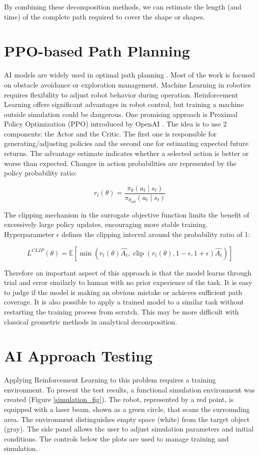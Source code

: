 \documentclass[11pt,a4paper,oneside,onecolumn]{article}
\begin{document}
By combining these decomposition methods, we can estimate the length (and time) of the complete path required to cover the shape or shapes.

\section{PPO-based Path Planning}
AI models are widely used in optimal path planning \cite{kufa2025pathplanning}. Most of the work is focused on obstacle avoidance or exploration management. Machine Learning in robotics requires flexibility to adjust robot behavior during operation. Reinforcement Learning offers significant advantages in robot control, but training a machine outside simulation could be dangerous. One promising approach is Proximal Policy Optimization (PPO) introduced by OpenAI \cite{schulman2017ppo}. The  idea is to use 2 components: the Actor and the Critic. The first one is responsible for generating/adjusting policies and the second one for estimating expected future returns. The advantage estimate indicates whether a selected action is better or worse than expected. Changes in action probabilities are represented by the policy probability ratio:

\begin{equation}
r_t(\theta) = \frac{\pi_{\theta}(a_t \mid s_t)}{\pi_{\theta_{\mathrm{old}}}(a_t \mid s_t)}
\end{equation}

The clipping mechanism in the surrogate objective function limits the benefit of excessively large policy updates, encouraging more stable training. Hyperparameter $\epsilon$ defines the clipping interval around the probability ratio of 1:

\begin{equation}
  L^{CLIP} (\theta) = \mathbb{E} [\min(r_t(\theta)\hat{A_t}, \operatorname{clip}(r_t(\theta), 1-\epsilon, 1+\epsilon)\hat{A_t})]
\end{equation}

Therefore an important aspect of this approach is that the model learns through trial and error similarly to human with no prior experience of the task. It is easy to judge if the model is making an obvious mistake or achieves sufficient path coverage. It is also possible to apply a trained model to a similar task without restarting the training process from scratch. This may be more difficult with classical geometric methods in analytical decomposition.

\section{AI Approach Testing}
Applying Reinforcement Learning to this problem requires a training environment. To present the test results, a functional simulation environment was created (Figure \ref{simulation_fig}). The robot, represented by a red point, is equipped with a laser beam, shown as a green circle, that scans the surrounding area. The environment distinguishes empty space (white) from the target object (gray). The side panel allows the user to adjust simulation parameters and initial conditions. The controls below the plots are used to manage training and simulation.
\end{document}
